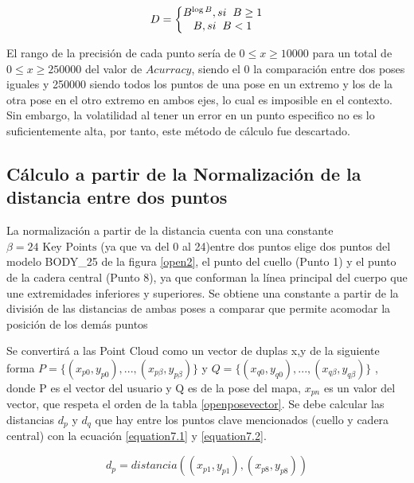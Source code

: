 \begin{equation}
D=\left\{\begin{matrix}
B^{\log B} , si \hspace{2mm} B \geq 1  \\
B , si \hspace{2mm} B <  1
\end{matrix}\right.
\label{equation18.2}
\end{equation}

El rango de la precisión de cada punto sería de $0 \leq x \geq 10000$ para un total de $0 \leq x \geq 250000$ del valor de $Acurracy$, siendo el 0 la comparación entre dos poses iguales y 250000 siendo todos los puntos de una pose en un extremo y los de la otra pose en el otro extremo en ambos ejes, lo cual es imposible en el contexto. Sin embargo, la volatilidad al tener un error en un punto especifico no es lo suficientemente alta, por tanto, este método de cálculo fue descartado.

 
\subsection{Cálculo a partir de la Normalización de la distancia entre dos puntos}

La normalización a partir de la distancia cuenta con una constante $\beta = 24\text{ Key Points}$ (ya que va del 0 al 24)entre dos puntos elige dos puntos del modelo BODY\_25 de la figura \ref{open2}, el punto del cuello (Punto 1) y el punto de la cadera central (Punto 8), ya que conforman la línea principal del cuerpo que une extremidades inferiores y superiores. Se obtiene una constante a partir de la división de las distancias de ambas poses a comparar que permite acomodar la posición de los demás puntos 

Se convertirá a las Point Cloud como un vector de duplas x,y de la siguiente forma $P=\{(x_{p0},y_{p0}),...,(x_{p\beta},y_{p\beta})\}$ y $Q=\{(x_{q0},y_{q0}),...,(x_{q\beta},y_{q\beta})\}$
, donde P es el vector del usuario y Q es de la pose del mapa, $x_{pn}$ es un valor del vector, que respeta el  orden de la tabla \ref{openposevector}. Se debe calcular las distancias $d_p$ y $d_q$ que hay entre los puntos clave mencionados (cuello y cadera central) con la ecuación \ref{equation7.1} y \ref{equation7.2}.

\begin{equation}
d_p= distancia((x_{p1},y_{p1}),(x_{p8},y_{p8}))
\label{equation7.1}
\end{equation}


